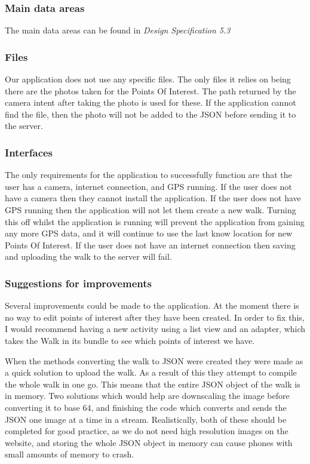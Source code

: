 \documentclass{project}
\begin{document}
\subsubsection{Main data areas}
The main data areas can be found in \textit{Design Specification 5.3}

\subsubsection{Files}
Our application does not use any specific files. The only files it relies on being there are the photos taken for the Points Of Interest.
The path returned by the camera intent after taking the photo is used for these.
If the application cannot find the file, then the photo will not be added to the JSON before sending it to the server.

\subsubsection{Interfaces}
The only requirements for the application to successfully function are that the user has a camera, internet connection, and GPS running.
If the user does not have a camera then they cannot install the application.
If the user does not have GPS running then the application will not let them create a new walk. Turning this off whilst the application is running
will prevent the application from gaining any more GPS data, and it will continue to use the last know location for new Points Of Interest.
If the user does not have an internet connection then saving and uploading the walk to the server will fail.

\subsubsection{Suggestions for improvements}
Several improvements could be made to the application. At the moment there is no way to edit points of interest after they have been created.
In order to fix this, I would recommend having a new activity using a list view and an adapter, which takes the Walk in its bundle to see
which points of interest we have.

When the methods converting the walk to JSON were created they were made as a quick solution to upload the walk.
As a result of this they attempt to compile the whole walk in one go. This means that the entire JSON object of the walk is in
memory. Two solutions which would help are downscaling the image before converting it to base 64, and finishing the code which
converts and sends the JSON one image at a time in a stream. Realistically, both of these should be completed for good practice, as we do
not need high resolution images on the website, and storing the whole JSON object in memory can cause phones with small amounts of memory
to crash.
\end{document}
